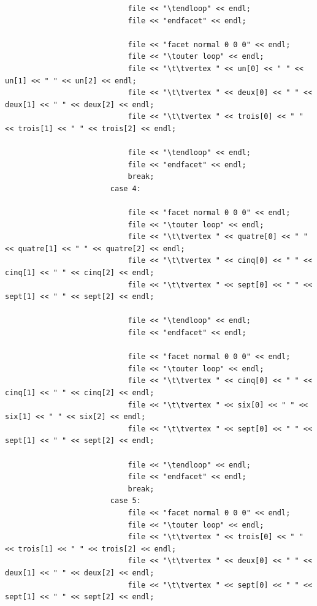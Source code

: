 \documentclass{article}
\begin{document}
\begin{lstlisting}
                            file << "\tendloop" << endl;
                            file << "endfacet" << endl;

                            file << "facet normal 0 0 0" << endl;
                            file << "\touter loop" << endl;
                            file << "\t\tvertex " << un[0] << " " << un[1] << " " << un[2] << endl;
                            file << "\t\tvertex " << deux[0] << " " << deux[1] << " " << deux[2] << endl;
                            file << "\t\tvertex " << trois[0] << " " << trois[1] << " " << trois[2] << endl;

                            file << "\tendloop" << endl;
                            file << "endfacet" << endl;
                            break;
                        case 4:

                            file << "facet normal 0 0 0" << endl;
                            file << "\touter loop" << endl;
                            file << "\t\tvertex " << quatre[0] << " " << quatre[1] << " " << quatre[2] << endl;
                            file << "\t\tvertex " << cinq[0] << " " << cinq[1] << " " << cinq[2] << endl;
                            file << "\t\tvertex " << sept[0] << " " << sept[1] << " " << sept[2] << endl;

                            file << "\tendloop" << endl;
                            file << "endfacet" << endl;

                            file << "facet normal 0 0 0" << endl;
                            file << "\touter loop" << endl;
                            file << "\t\tvertex " << cinq[0] << " " << cinq[1] << " " << cinq[2] << endl;
                            file << "\t\tvertex " << six[0] << " " << six[1] << " " << six[2] << endl;
                            file << "\t\tvertex " << sept[0] << " " << sept[1] << " " << sept[2] << endl;

                            file << "\tendloop" << endl;
                            file << "endfacet" << endl;
                            break;
                        case 5:
                            file << "facet normal 0 0 0" << endl;
                            file << "\touter loop" << endl;
                            file << "\t\tvertex " << trois[0] << " " << trois[1] << " " << trois[2] << endl;
                            file << "\t\tvertex " << deux[0] << " " << deux[1] << " " << deux[2] << endl;
                            file << "\t\tvertex " << sept[0] << " " << sept[1] << " " << sept[2] << endl;


\end{lstlisting}
\end{document}
